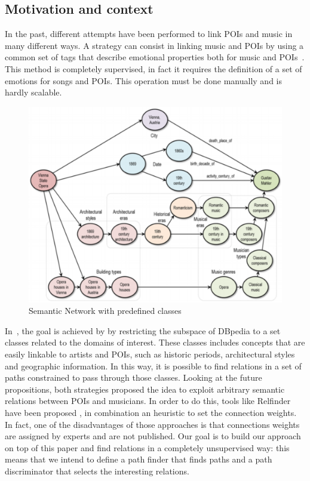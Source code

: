 \documentclass[paper=a4, fontsize=11pt]{scrartcl}
\begin{document}
\subsection{Motivation and context}
In the past, different attempts have been performed to link POIs and music in many different ways. A strategy can consist in linking music and POIs by using a common set of tags that describe emotional properties both for music and POIs~\cite{Kaminskas:2013:LMR:2507157.2507180}. This method is completely supervised, in fact it requires the definition of a set of emotions for songs and POIs. This operation must be done manually and is hardly scalable.
\begin{figure}[!htb]
  \centering
    \includegraphics[width=1\textwidth]{images/semantic_net.png}
    \caption{Semantic Network with predefined classes}
\end{figure}

In~\cite{Kaminskas:2012:KMR:2390848.2390854}, the goal is achieved by by restricting the subspace of DBpedia to a set classes related to the domains of interest. These classes includes concepts that are easily linkable to artists and POIs, such as historic periods, architectural styles and geographic information. In this way, it is possible to find relations in a set of paths constrained to pass through those classes.
Looking at the future propositions, both strategies proposed the idea to exploit arbitrary semantic relations between POIs and musicians.
In order to do this, tools like Relfinder have been proposed \cite{Heim:2009:RRR:1695324.1695351}, in combination an heuristic to set the connection weights. In fact, one of the disadvantages of those approaches is that connections weights are assigned by experts and are not published.
Our goal is to build our approach on top of this paper and find relations in a completely unsupervised way: this means that we intend to define a path finder that finds paths and a path discriminator that selects the interesting relations.
\end{document}
